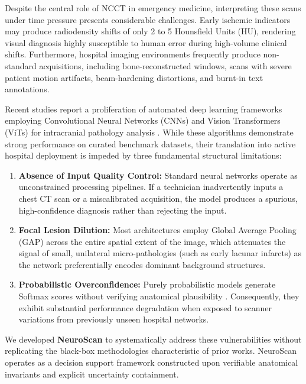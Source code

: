 \documentclass[conference]{IEEEtran}
\begin{document}
Despite the central role of NCCT in emergency medicine, interpreting these scans under time pressure presents considerable challenges. Early ischemic indicators may produce radiodensity shifts of only 2 to 5 Hounsfield Units (HU), rendering visual diagnosis highly susceptible to human error during high-volume clinical shifts. Furthermore, hospital imaging environments frequently produce non-standard acquisitions, including bone-reconstructed windows, scans with severe patient motion artifacts, beam-hardening distortions, and burnt-in text annotations.

Recent studies report a proliferation of automated deep learning frameworks employing Convolutional Neural Networks (CNNs) and Vision Transformers (ViTs) for intracranial pathology analysis \cite{b3, b4, b16}. While these algorithms demonstrate strong performance on curated benchmark datasets, their translation into active hospital deployment is impeded by three fundamental structural limitations:
\begin{enumerate}
    \item \textbf{Absence of Input Quality Control:} Standard neural networks operate as unconstrained processing pipelines. If a technician inadvertently inputs a chest CT scan or a miscalibrated acquisition, the model produces a spurious, high-confidence diagnosis rather than rejecting the input.
    \item \textbf{Focal Lesion Dilution:} Most architectures employ Global Average Pooling (GAP) across the entire spatial extent of the image, which attenuates the signal of small, unilateral micro-pathologies (such as early lacunar infarcts) as the network preferentially encodes dominant background structures.
    \item \textbf{Probabilistic Overconfidence:} Purely probabilistic models generate Softmax scores without verifying anatomical plausibility \cite{b13}. Consequently, they exhibit substantial performance degradation when exposed to scanner variations from previously unseen hospital networks.
\end{enumerate}

\noindent We developed \textbf{NeuroScan} to systematically address these vulnerabilities without replicating the black-box methodologies characteristic of prior works. NeuroScan operates as a decision support framework constructed upon verifiable anatomical invariants and explicit uncertainty containment.
\end{document}
